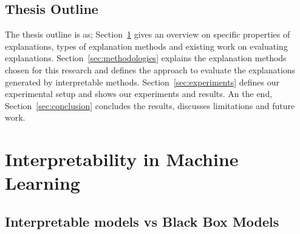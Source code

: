 \documentclass[english]{tktltiki2}
\theoremstyle{definition}
\theoremstyle{remark}
\begin{document}
\subsection{Thesis Outline} %
The thesis outline is as; Section~\ref{sec:interpretability_in_ML} gives an overview on specific properties of explanations, types of explanation methods and existing work on evaluating explanations. Section~\ref{sec:methodologies}  explains the explanation methods chosen for this research and defines the approach to evaluate the explanations generated by interpretable methods. Section~\ref{sec:experiments} defines our experimental setup and shows our experiments and results. An the end, Section~\ref{sec:conclusion} concludes the results, discusses limitations and future work.


\section{Interpretability in Machine Learning}\label{sec:interpretability_in_ML} %

\subsection{Interpretable models vs Black Box Models} %
\end{document}
